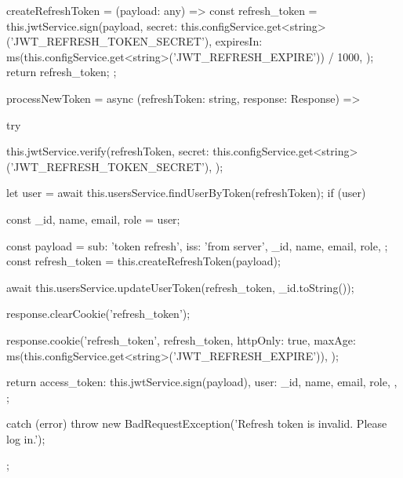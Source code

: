 {  createRefreshToken = (payload: any) => {
    const refresh_token = this.jwtService.sign(payload, {
      secret: this.configService.get<string>('JWT_REFRESH_TOKEN_SECRET'),
      expiresIn:
        ms(this.configService.get<string>('JWT_REFRESH_EXPIRE')) / 1000,
    });
    return refresh_token;
  };

  processNewToken = async (refreshToken: string, response: Response) => {
    try {
      this.jwtService.verify(refreshToken, {
        secret: this.configService.get<string>('JWT_REFRESH_TOKEN_SECRET'),
      });

      let user = await this.usersService.findUserByToken(refreshToken);
      if (user) {
        const { _id, name, email, role } = user;

        const payload = {
          sub: 'token refresh',
          iss: 'from server',
          _id,
          name,
          email,
          role,
        };
        const refresh_token = this.createRefreshToken(payload);

        await this.usersService.updateUserToken(refresh_token, _id.toString());

        response.clearCookie('refresh_token');

        response.cookie('refresh_token', refresh_token, {
          httpOnly: true,
          maxAge: ms(this.configService.get<string>('JWT_REFRESH_EXPIRE')),
        });

        return {
          access_token: this.jwtService.sign(payload),
          user: {
            _id,
            name,
            email,
            role,
          },
        };
      }
    } catch (error) {
      throw new BadRequestException('Refresh token is invalid. Please log in.');
    }
  };
}
